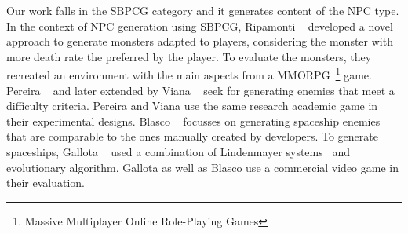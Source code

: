 Our work falls in the SBPCG category and it generates content of the NPC type. In the context of NPC generation using SBPCG, Ripamonti \etal~\cite{ripamonti2021dragon} developed a novel approach to generate monsters adapted to players, considering the monster with more death rate the preferred by the player. To evaluate the monsters, they recreated an environment with the main aspects from a MMORPG~\footnote{Massive Multiplayer Online Role-Playing Games} game. Pereira \etal~\cite{pereira2021procedural_enemies} and later extended by Viana \etal~\cite{viana2022illuminating} seek for generating enemies that meet a difficulty criteria. Pereira \etal and Viana \etal use the same research academic game in their experimental designs. Blasco \etal~\cite{blasco2021evolutionary} focusses on generating spaceship enemies that are comparable to the ones manually created by developers. To generate spaceships, Gallota \etal~\cite{gallotta2022evolving} used a combination of Lindenmayer systems~\cite{lindenmayer1968mathematical} and evolutionary algorithm. Gallota \etal as well as Blasco \etal use a commercial video game in their evaluation.
